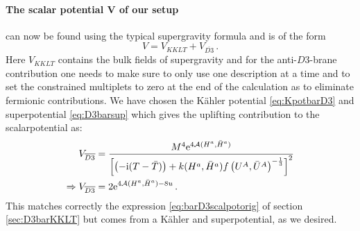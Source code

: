 \documentclass[a4paper,12pt,twoside,openright]{report}
\newcommand{\be}{\begin{equation}}
\newcommand{\ee}{\end{equation}}
\newcommand{\bea}{\begin{equation}\begin{aligned}}
\newcommand{\eea}{\end{aligned}\end{equation}}
\def\rmi{{\rm i}}
\def\rme{{\rm e}}
\begin{document}
\paragraph{The scalar potential $\mathbf{V}$ of our setup} can now be found using the typical supergravity formula and is of the form
\be 
V = V_{KKLT} + V_{\overline{D3}}\,.
\ee
Here $V_{KKLT}$ contains the bulk fields of supergravity and for the anti-$D3$-brane contribution one needs to make sure to only use one description at a time and to set the constrained multiplets to zero at the end of the calculation as to eliminate fermionic contributions. We have chosen the Kähler potential \eqref{eq:KpotbarD3} and superpotential \eqref{eq:D3barsup} which gives the uplifting contribution to the scalarpotential as:
\bea
V_{\overline{D3}} &= \frac{M^4 \rme^{4\mathcal{A}(H^a,\bar{H}^a)}}{\left[\left(-\rmi(T-\bar{T})\right) + k(H^a,\bar{H}^a)f\left(U^A,\bar{U}^A\right)^{-\frac{1}{3}}\right]^2}\\
\Rightarrow V_{\overline{D3}} &= 2 \rme^{4\mathcal{A}(H^a,\bar{H}^a)-8u}\,.
\eea
This matches correctly the expression \eqref{eq:barD3scalpotorig} of section \ref{sec:D3barKKLT} but comes from a Kähler and superpotential, as we desired.
\end{document}
